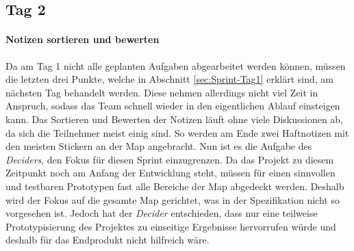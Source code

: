 \subsection*{\label{sec:Sprint-Umsetzung-Tag2}\thesubsection\quad Tag 2}
\paragraph{Notizen sortieren und bewerten}
Da am Tag 1 nicht alle geplanten Aufgaben abgearbeitet werden können, müssen die letzten drei Punkte, welche in Abschnitt \ref{sec:Sprint-Tag1} erklärt sind, am nächsten Tag behandelt werden. Diese nehmen allerdings nicht viel Zeit in Anspruch, sodass das Team schnell wieder in den eigentlichen Ablauf einsteigen kann. Das Sortieren und Bewerten der Notizen läuft ohne viele Diskussionen ab, da sich die Teilnehmer meist einig sind. So werden am Ende zwei Haftnotizen mit den meisten Stickern an der Map angebracht. 
Nun ist es die Aufgabe des \textit{Deciders}, den Fokus für diesen Sprint einzugrenzen. Da das Projekt zu diesem Zeitpunkt noch am Anfang der Entwicklung steht, müssen für einen sinnvollen und testbaren Prototypen fast alle Bereiche der Map abgedeckt werden. Deshalb wird der Fokus auf die gesamte Map gerichtet, was in der Spezifikation nicht so vorgesehen ist. Jedoch hat der \textit{Decider} entschieden, dass nur eine teilweise Prototypisierung des Projektes zu einseitige Ergebnisse hervorrufen würde und deshalb für das Endprodukt nicht hilfreich wäre.



